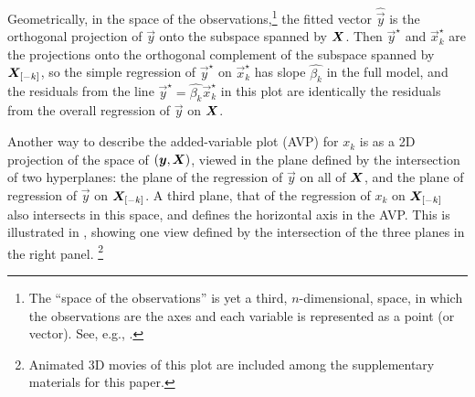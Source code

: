 Geometrically, in the space of the observations,\footnote{The ``space of the observations'' is yet a third, $n$-dimensional, space, in which the observations are the axes and each variable is represented as a point (or vector). See, e.g., \citet[Ch.~10]{Fox:2008}.} the fitted vector $\widehat{\vec{y}}$ is the orthogonal projection of $\vec{y}$
onto the subspace spanned by $\bm{X}$. Then $\vec{y}^\star$ and $\vec{x}^\star_k$ are the projections onto
the orthogonal complement of the subspace spanned by $\bm{X}_{[-k]}$, so
the simple regression of $\vec{y}^\star$ on $\vec{x}^\star_k$ has slope $\hat{\beta_k}$ in the full model,
and the residuals from the line $\vec{y}^\star = \hat{\beta_k} \vec{x}^\star_k$ in this plot are identically
the residuals from the overall regression of $\vec{y}$ on $\bm{X}$.

Another way to describe the added-variable plot (AVP) for $x_k$ is as a 2D projection of the space of
$(\bm{y}, \bm{X})$, viewed in the plane defined by the intersection of two hyperplanes:
the plane of the regression of $\vec{y}$ on all of $\bm{X}$, and the plane of regression of
$\vec{y}$ on $\bm{X}_{[-k]}$. A third plane, that of the regression of $x_k$ on $\bm{X}_{[-k]}$
also intersects in this space, and defines the horizontal axis in the AVP.
This is illustrated in , showing one view defined by the intersection of
the three planes in the right panel.%
\footnote{Animated 3D movies of this plot are included among the supplementary materials for this paper.}

